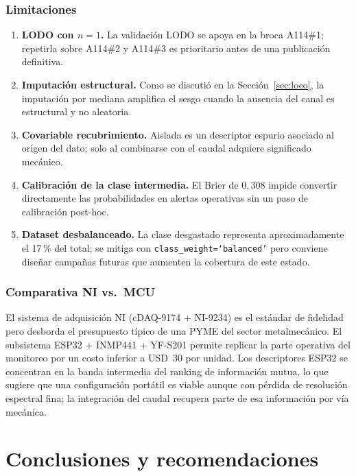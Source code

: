 \documentclass[12pt, letterpaper]{report}
\begin{document}
\subsection{Limitaciones}
\begin{enumerate}
\item \textbf{LODO con $n=1$.} La validación LODO se apoya en la broca
      A114\#1; repetirla sobre A114\#2 y A114\#3 es prioritario antes
      de una publicación definitiva.
\item \textbf{Imputación estructural.} Como se discutió en
      la Sección~\ref{sec:loeo}, la imputación por mediana amplifica el
      sesgo cuando la ausencia del canal es estructural y no aleatoria.
\item \textbf{Covariable recubrimiento.} Aislada es un descriptor
      espurio asociado al origen del dato; solo al combinarse con el
      caudal adquiere significado mecánico.
\item \textbf{Calibración de la clase intermedia.} El Brier de
      $0{,}308$ impide convertir directamente las probabilidades en
      alertas operativas sin un paso de calibración post-hoc.
\item \textbf{Dataset desbalanceado.} La clase desgastado representa
      aproximadamente el 17\,\% del total; se mitiga con
      \texttt{class\_weight=`balanced'} pero conviene diseñar campañas
      futuras que aumenten la cobertura de este estado.
\end{enumerate}

\subsection{Comparativa NI vs.~MCU}
El sistema de adquisición NI (cDAQ-9174 + NI-9234) es el estándar de
fidelidad pero desborda el presupuesto típico de una PYME del sector
metalmecánico. El subsistema ESP32 + INMP441 + YF-S201 permite replicar
la parte operativa del monitoreo por un costo inferior a USD~30 por
unidad. Los descriptores ESP32 se concentran en la banda intermedia del
ranking de información mutua, lo que sugiere que una configuración
portátil es viable aunque con pérdida de resolución espectral fina; la
integración del caudal recupera parte de esa información por vía
mecánica.

\clearpage
\chapter{Conclusiones y recomendaciones}
\label{cap:conclusiones}
\end{document}
